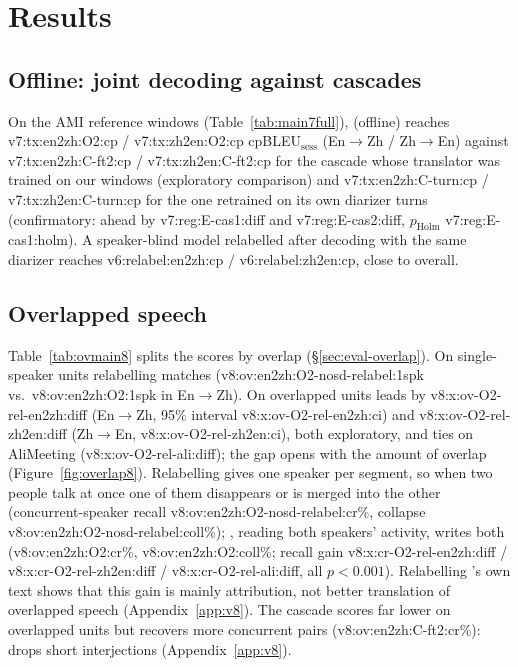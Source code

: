 \section{Results}
\label{sec:results}

\subsection{Offline: joint decoding against cascades}
\label{sec:res-offline}

On the AMI reference windows (Table~\ref{tab:main7full}), \sys{} (offline) reaches
\num{v7:tx:en2zh:O2:cp} / \num{v7:tx:zh2en:O2:cp} cpBLEU$_\text{sess}$ (En$\rightarrow$Zh / Zh$\rightarrow$En) against
\num{v7:tx:en2zh:C-ft2:cp} / \num{v7:tx:zh2en:C-ft2:cp} for the cascade whose translator was trained on our windows
(exploratory comparison) and \num{v7:tx:en2zh:C-turn:cp} / \num{v7:tx:zh2en:C-turn:cp} for the one retrained on its own
diarizer turns (confirmatory: \sys{} ahead by \num{v7:reg:E-cas1:diff} and \num{v7:reg:E-cas2:diff}, $p_\text{Holm}$
\num{v7:reg:E-cas1:holm}). A speaker-blind model relabelled after decoding with the same diarizer reaches
\num{v6:relabel:en2zh:cp} / \num{v6:relabel:zh2en:cp}, close to \sys{} overall.

\subsection{Overlapped speech}
\label{sec:res-overlap}



Table~\ref{tab:ovmain8} splits the scores by overlap (\S\ref{sec:eval-overlap}). On single-speaker units relabelling
matches \sys{} (\num{v8:ov:en2zh:O2-nosd-relabel:1spk} vs.\ \num{v8:ov:en2zh:O2:1spk} in En$\rightarrow$Zh). On
overlapped units \sys{} leads by \num{v8:x:ov-O2-rel-en2zh:diff} (En$\rightarrow$Zh, 95\% interval
\num{v8:x:ov-O2-rel-en2zh:ci}) and \num{v8:x:ov-O2-rel-zh2en:diff} (Zh$\rightarrow$En, \num{v8:x:ov-O2-rel-zh2en:ci}),
both exploratory, and ties on AliMeeting (\num{v8:x:ov-O2-rel-ali:diff}); the gap opens with the amount of overlap
(Figure~\ref{fig:overlap8}). Relabelling gives one speaker per segment, so when two people talk at once one of them
disappears or is merged into the other (concurrent-speaker recall \num{v8:ov:en2zh:O2-nosd-relabel:cr}\%, collapse
\num{v8:ov:en2zh:O2-nosd-relabel:coll}\%); \sys{}, reading both speakers' activity, writes both (\num{v8:ov:en2zh:O2:cr}\%,
\num{v8:ov:en2zh:O2:coll}\%; recall gain \num{v8:x:cr-O2-rel-en2zh:diff} / \num{v8:x:cr-O2-rel-zh2en:diff} /
\num{v8:x:cr-O2-rel-ali:diff}, all $p<0.001$). Relabelling \sys{}'s own text shows that this gain is mainly
attribution, not better translation of overlapped speech (Appendix~\ref{app:v8}). The cascade scores far lower on overlapped units but recovers more
concurrent pairs (\num{v8:ov:en2zh:C-ft2:cr}\%): \sys{} drops short interjections (Appendix~\ref{app:v8}).
\label{sec:res-real}
\label{sec:res-speech}

